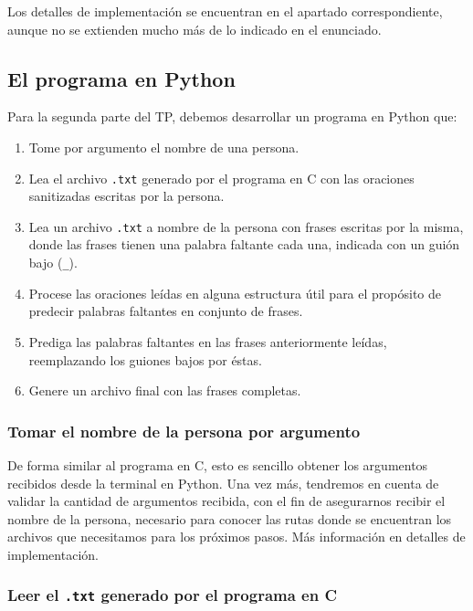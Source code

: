 \documentclass[a4paper]{article}
\begin{document}
Los detalles de implementación se encuentran en el apartado correspondiente, aunque no se extienden mucho más de lo indicado en el enunciado.

\subsection{El programa en Python}

\noindent Para la segunda parte del TP, debemos desarrollar un programa en Python que:

\begin{enumerate}
    \item Tome por argumento el nombre de una persona.
    \item Lea el archivo \texttt{.txt} generado por el programa en C con las oraciones sanitizadas escritas por la persona.
    \item Lea un archivo \texttt{.txt} a nombre de la persona con frases escritas por la misma, donde las frases tienen una palabra faltante cada una, indicada con un guión bajo (\texttt{\_}).
    \item Procese las oraciones leídas en alguna estructura útil para el propósito de predecir palabras faltantes en conjunto de frases.
    \item Prediga las palabras faltantes en las frases anteriormente leídas, reemplazando los guiones bajos por éstas.
    \item Genere un archivo final con las frases completas.
\end{enumerate}

\subsubsection{Tomar el nombre de la persona por argumento}

De forma similar al programa en C, esto es sencillo obtener los argumentos recibidos desde la terminal en Python. Una vez más, tendremos en cuenta de validar la cantidad de argumentos recibida, con el fin de asegurarnos recibir el nombre de la persona, necesario para conocer las rutas donde se encuentran los archivos que necesitamos para los próximos pasos. Más información en detalles de implementación.

\subsubsection{Leer el \texttt{.txt} generado por el programa en C}
\end{document}
